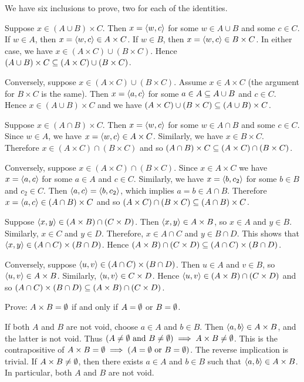 \begin{solution}
We have six inclusions to prove, two for each of the identities.

Suppose $x\in (A\cup B)\times C$. Then $x=\left\langle w, c\right\rangle$ for some $w\in A\cup B$ and some $c\in C$.
If $w\in A$, then $x=\left\langle w, c\right\rangle\in A\times C$. If $w\in B$, then $x=\left\langle w, c\right\rangle\in B\times C$.
In either case, we have $x\in (A\times C)\cup (B\times C)$.
Hence $(A\cup B)\times C \subseteq (A\times C)\cup (B\times C)$.

Conversely, suppose $x\in (A\times C)\cup (B\times C)$. Assume $x\in A\times C$ (the argument for $B\times C$ is the same).
Then $x=\left\langle a,c\right\rangle$ for some $a\in A\subseteq A\cup B$ and $c\in C$.
Hence $x\in (A\cup B)\times C$ and we have $(A\times C)\cup (B\times C) \subseteq (A\cup B)\times C$.

Suppose $x\in (A\cap B)\times C$. Then $x=\left\langle w, c\right\rangle$ for some $w\in A\cap B$ and some $c\in C$.
Since $w\in A$, we have $x=\left\langle w, c\right\rangle\in A\times C$. Similarly, we have $x\in B\times C$.
Therefore $x\in (A\times C)\cap (B\times C)$ and so $(A\cap B)\times C \subseteq (A\times C)\cap (B\times C)$.

Conversely, suppose $x\in (A\times C)\cap (B\times C)$. Since $x\in A\times C$ we have $x=\left\langle a,c\right\rangle$ for
some $a\in A$ and $c\in C$.
Similarly, we have $x=\left\langle b,c_2\right\rangle$ for some $b\in B$ and $c_2\in C$.
Then $\left\langle a,c\right\rangle=\left\langle b,c_2\right\rangle$, which implies $a=b\in A\cap B$.
Therefore $x=\left\langle a,c\right\rangle\in (A\cap B)\times C$ and so $(A\times C)\cap (B\times C)\subseteq (A\cap B)\times C$.

Suppose $\left\langle x, y\right\rangle \in (A \times B)\cap (C \times D)$. Then $\left\langle x, y\right\rangle\in A\times B$,
so $x\in A$ and $y \in B$. Similarly, $x \in C$ and $y\in D$.
Therefore, $x\in A\cap C$ and $y\in B\cap D$.
This shows that $\left\langle x, y\right\rangle\in(A\cap C)\times (B\cap D)$.
Hence $(A \times B)\cap (C \times D) \subseteq (A\cap C)\times (B\cap D)$.

Conversely, suppose $\left\langle u,v\right\rangle\in (A\cap C)\times (B\cap D)$.
Then $u\in A$ and $v\in B$, so $\left\langle u,v\right\rangle\in A\times B$. Similarly, $\left\langle u,v\right\rangle\in C\times D$.
Hence $\left\langle u,v\right\rangle\in (A\times B)\cap (C\times D)$ and so
$(A\cap C)\times (B\cap D)\subseteq (A\times B)\cap (C\times D)$.
\end{solution}

\begin{exercise}
Prove: $A\times B = \emptyset$ if and only if $A=\emptyset$ or $B=\emptyset$.
\end{exercise}

\begin{solution}
If both $A$ and $B$ are not void, choose $a \in A$ and $b\in B$. Then $\left\langle a,b\right\rangle\in A \times B$,
and the latter is not void. Thus $(A\neq\emptyset \text{ and } B\neq\emptyset)\implies A\times B\neq\emptyset$.
This is the contrapositive of $A\times B = \emptyset\implies (A=\emptyset\text{ or } B=\emptyset)$.
The reverse implication is trivial. If $A\times B\neq \emptyset$, then there exists $a\in A$
and $b\in B$ such that $\left\langle a,b\right\rangle\in A\times B$. In particular, both $A$ and $B$ are not void.

\end{solution}

